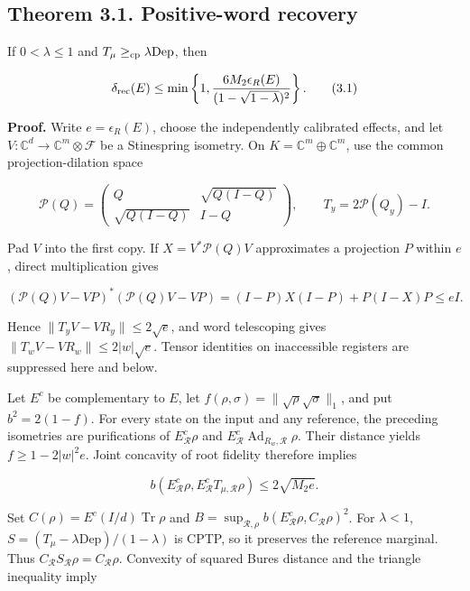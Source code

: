 \documentclass[11pt]{article}
\begin{document}
\subsection*{Theorem 3.1. Positive-word recovery}

If \(0<\lambda\le1\) and \(T_\mu\ge_{\rm cp}\lambda\mathrm{Dep}\), then

\[
\delta_{\rm rec}(E)\le
\min\left\{1,\frac{6M_2\epsilon_R(E)}{(1-\sqrt{1-\lambda})^2}\right\}.
\tag{3.1}
\]

\textbf{Proof.} Write \(e=\epsilon_R(E)\), choose the independently calibrated
effects, and let \(V:\mathbb C^d\to\mathbb C^m\otimes\mathcal F\) be a
Stinespring isometry. On \(K=\mathbb C^m\oplus\mathbb C^m\), use the common
projection-dilation space

\[
\mathcal P(Q)=
\begin{pmatrix}Q&\sqrt{Q(I-Q)}\\\sqrt{Q(I-Q)}&I-Q\end{pmatrix},
\qquad T_y=2\mathcal P(Q_y)-I.
\tag{3.2}
\]

Pad \(V\) into the first copy. If \(X=V^*\mathcal P(Q)V\) approximates a
projection \(P\) within \(e\), direct multiplication gives

\[
(\mathcal P(Q)V-VP)^*(\mathcal P(Q)V-VP)
=(I-P)X(I-P)+P(I-X)P\le eI.
\tag{3.3}
\]

Hence \(\|T_yV-VR_y\|\le2\sqrt e\), and word telescoping gives
\(\|T_wV-VR_w\|\le2|w|\sqrt e\). Tensor identities on inaccessible
registers are suppressed here and below.

Let \(E^c\) be complementary to \(E\), let
\(f(\rho,\sigma)=\|\sqrt\rho\sqrt\sigma\|_1\), and put
\(b^2=2(1-f)\). For every state on the input and any reference, the preceding
isometries are purifications of \(E^c_{\mathcal R}\rho\) and
\(E^c_{\mathcal R}\operatorname{Ad}_{R_w,\mathcal R}\rho\). Their distance yields
\(f\ge1-2|w|^2e\). Joint concavity of root fidelity therefore implies

\[
b(E^c_{\mathcal R}\rho,E^c_{\mathcal R}T_{\mu,\mathcal R}\rho)\le2\sqrt{M_2e}.
\tag{3.4}
\]

Set \(C(\rho)=E^c(I/d)\operatorname{Tr}\rho\) and
\(B=\sup_{\mathcal R,\rho}b(E^c_{\mathcal R}\rho,C_{\mathcal R}\rho)^2\).
For \(\lambda<1\),
\(S=(T_\mu-\lambda\mathrm{Dep})/(1-\lambda)\) is CPTP, so it preserves
the reference marginal. Thus \(C_{\mathcal R}S_{\mathcal R}\rho=C_{\mathcal R}\rho\). Convexity of squared
Bures distance and the triangle inequality imply
\end{document}
